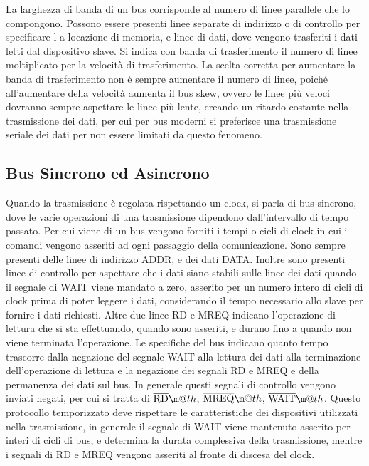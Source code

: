 \documentclass{article}
\makeatletter
\newcommand*{\textoverline}[1]{$\overline{\hbox{#1}}\m@th$}
\numberwithin{equation}{subsection}
\makeatother
\begin{document}
La larghezza di banda di un bus corrisponde al numero di linee parallele che lo compongono. Possono essere presenti linee separate di indirizzo o di controllo per specificare l
a locazione di memoria, e linee di dati, dove vengono trasferiti i dati letti dal dispositivo slave. Si indica con banda di trasferimento il numero di linee moltiplicato per la velocità 
di trasferimento. 
La scelta corretta per aumentare la banda di trasferimento non è sempre aumentare il numero di linee, poiché all'aumentare della velocità aumenta il bus skew, ovvero le linee 
più veloci dovranno sempre aspettare le linee più lente, creando un ritardo costante nella trasmissione dei dati, per cui per bus moderni si preferisce una trasmissione seriale 
dei dati per non essere limitati da questo fenomeno. 

\subsection{Bus Sincrono ed Asincrono}

Quando la trasmissione è regolata rispettando un clock, si parla di bus sincrono, dove le varie operazioni di una trasmissione dipendono dall'intervallo di tempo 
passato. Per cui viene di un bus vengono forniti i tempi o cicli di clock in cui i comandi vengono asseriti ad ogni passaggio della comunicazione. 
Sono sempre presenti delle linee di indirizzo ADDR, e dei dati DATA. Inoltre sono presenti linee di controllo per aspettare che i dati siano stabili sulle linee dei dati 
quando il segnale di WAIT viene mandato a zero, asserito per un numero intero di cicli di clock prima di poter leggere i dati, considerando il tempo necessario allo slave 
per fornire i dati richiesti. Altre due linee RD e MREQ indicano l'operazione di lettura che si sta effettuando, quando sono asseriti, e durano fino a quando non viene terminata 
l'operazione. Le specifiche del bus indicano quanto tempo trascorre dalla negazione del segnale WAIT alla lettura dei dati alla terminazione dell'operazione di lettura e la 
negazione dei segnali RD e MREQ e della permanenza dei dati sul bus. 
In generale questi segnali di controllo vengono inviati negati, per cui si tratta di \textoverline{RD}, \textoverline{MREQ}, \textoverline{WAIT}. 
Questo protocollo temporizzato deve rispettare le caratteristiche dei dispositivi utilizzati nella trasmissione, in generale il segnale di WAIT viene mantenuto 
asserito per interi di cicli di bus, e determina la durata complessiva della trasmissione, mentre i segnali di RD e MREQ vengono asseriti al fronte di discesa del clock. 
\end{document}
